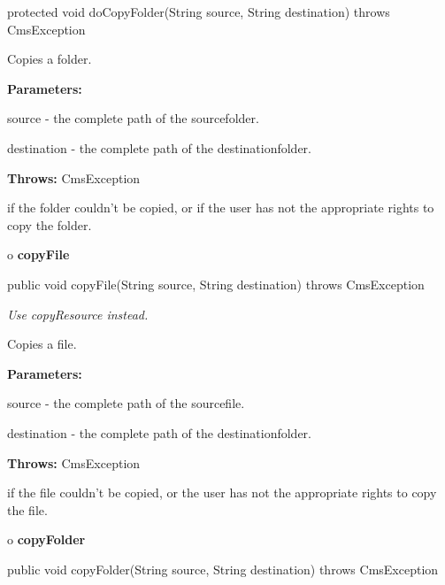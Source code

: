 \begin{PRE}
 protected void doCopyFolder(String source,
                             String destination) throws CmsException
\end{PRE}

\begin{description}
\htmlDD Copies a folder. 

\begin{description}
\item {\bf Parameters:}  

source - the complete path of the sourcefolder.  

destination - the complete path of the destinationfolder.  
\item {\bf Throws:} CmsException  

if the folder couldn't be copied, or if the user has not the appropriate
rights to copy the folder.  
\end{description}

\end{description}

o {\bf copyFile} 

\begin{PRE}
 public void copyFile(String source,
                      String destination) throws CmsException
\end{PRE}

\begin{description}
 {\it Use copyResource instead.} 

Copies a file. 

\begin{description}
\item {\bf Parameters:}  

source - the complete path of the sourcefile.  

destination - the complete path of the destinationfolder.  
\item {\bf Throws:} CmsException  

if the file couldn't be copied, or the user has not the appropriate rights to
copy the file.  
\end{description}

\end{description}

o {\bf copyFolder} 

\begin{PRE}
 public void copyFolder(String source,
                        String destination) throws CmsException
\end{PRE}

